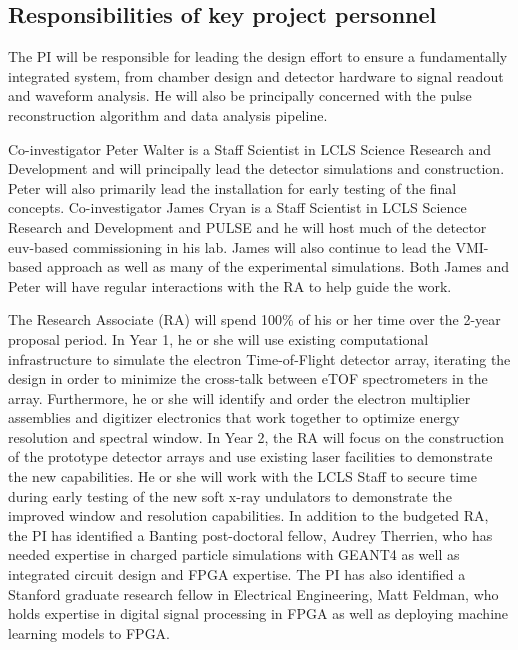 \subsection*{Responsibilities of key project personnel}
The PI will be responsible for leading the design effort to ensure a fundamentally integrated system, from chamber design and detector hardware to signal readout and waveform analysis.
He will also be principally concerned with the pulse reconstruction algorithm and data analysis pipeline.

Co-investigator Peter Walter is a Staff Scientist in LCLS Science Research and Development and will principally lead the detector simulations and construction.
Peter will also primarily lead the installation for early testing of the final concepts.
Co-investigator James Cryan is a Staff Scientist in LCLS Science Research and Development and PULSE and he will host much of the detector euv-based commissioning in his lab.
James will also continue to lead the VMI-based approach as well as many of the experimental simulations.
Both James and Peter will have regular interactions with the RA to help guide the work.

The Research Associate (RA) will spend 100\% of his or her time over the 2-year proposal period.  
In Year 1, he or she will use existing computational infrastructure to simulate the electron Time-of-Flight detector array, iterating the design in order to minimize the cross-talk between eTOF spectrometers in the array.  
Furthermore, he or she will identify and order the electron multiplier assemblies and digitizer electronics that work together to optimize energy resolution and spectral window.  
In Year 2, the RA will focus on the construction of the prototype detector arrays and use existing laser facilities to demonstrate the new capabilities.  
He or she will work with the LCLS Staff to secure time during early testing of the new soft x-ray undulators to demonstrate the improved window and resolution capabilities.
In addition to the budgeted RA, the PI has identified a Banting post-doctoral fellow, Audrey Therrien, who has needed expertise in charged particle simulations with GEANT4 as well as integrated circuit design and FPGA expertise.
The PI has also identified a Stanford graduate research fellow in Electrical Engineering, Matt Feldman, who holds expertise in digital signal processing in FPGA as well as deploying machine learning models to FPGA.


